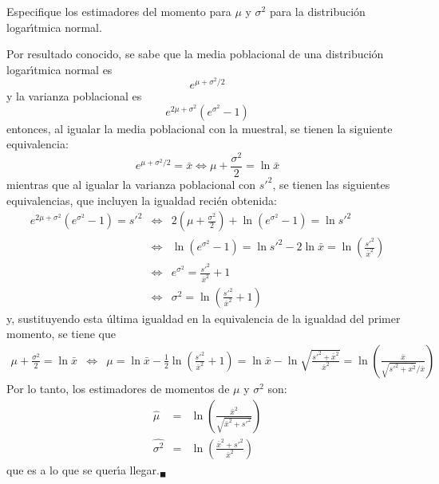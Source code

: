 \begin{enunciado}
 Especifique los estimadores del momento para $\mu$ y $\sigma^2$ para la distribuci\'on logar\'{\i}tmica normal.
\end{enunciado}

\begin{solucion}
 Por resultado conocido, se sabe que la media poblacional de una distribuci\'on logar\'{\i}tmica normal es
 \begin{equation*}
  e^{\mu + \sigma^2/2}
 \end{equation*}
 y la varianza poblacional es
 \begin{equation*}
  e^{2\mu+\sigma^2}\left( e^{\sigma^2} - 1 \right)
 \end{equation*}
 entonces, al igualar la media poblacional con la muestral, se tienen la siguiente equivalencia:
 \begin{equation*}
  e^{\mu + \sigma^2/2} = \bar{x} \Leftrightarrow \mu + \frac{\sigma^2}{2} = \ln \bar{x}
 \end{equation*}
 mientras que al igualar la varianza poblacional con $s'^2$, se tienen las siguientes equivalencias, que incluyen la igualdad reci\'en obtenida:
 \begin{eqnarray*}
  e^{2\mu+\sigma^2}\left( e^{\sigma^2} - 1 \right) = s'^2 & \Leftrightarrow & 2\left( \mu + \frac{\sigma^2}{2} \right) + \ln\left( e^{\sigma^2} - 1 \right) = \ln s'^2 \\
  & \Leftrightarrow & \ln\left( e^{\sigma^2} - 1 \right) = \ln s'^2 - 2\ln \bar{x} = \ln \left( \frac{s'^2}{\bar{x}^2} \right) \\
  & \Leftrightarrow & e^{\sigma^2} = \frac{s'^2}{\bar{x}^2} + 1 \\
  & \Leftrightarrow & \sigma^2 = \ln \left( \frac{s'^2}{\bar{x}^2} + 1 \right)
 \end{eqnarray*}
 y, sustituyendo esta \'ultima igualdad en la equivalencia de la igualdad del primer momento, se tiene que
 \begin{eqnarray*}
  \mu + \frac{\sigma^2}{2} = \ln \bar{x} & \Leftrightarrow & \mu = \ln \bar{x} - \frac{1}{2}\ln \left( \frac{s'^2}{\bar{x}^2} + 1 \right) = \ln \bar{x} - \ln \sqrt{\frac{s'^2 + \bar{x}^2}{\bar{x}^2}} = \ln \left( \frac{\bar{x}}{\sqrt{s'^2 + \bar{x^2}}/\bar{x}} \right)
 \end{eqnarray*}
 Por lo tanto, los estimadores de momentos de $\mu$ y $\sigma^2$ son:
 \begin{eqnarray*}
  \widehat{\mu} & = & \ln \left( \frac{\bar{x}^2}{\sqrt{\bar{x}^2 + s'^2}} \right) \\
  \widehat{\sigma^2} & = & \ln\left( \frac{\bar{x}^2 + s'^2}{\bar{x}^2} \right)
 \end{eqnarray*}
 que es a lo que se quer\'{\i}a llegar.${}_{\blacksquare}$
\end{solucion}
